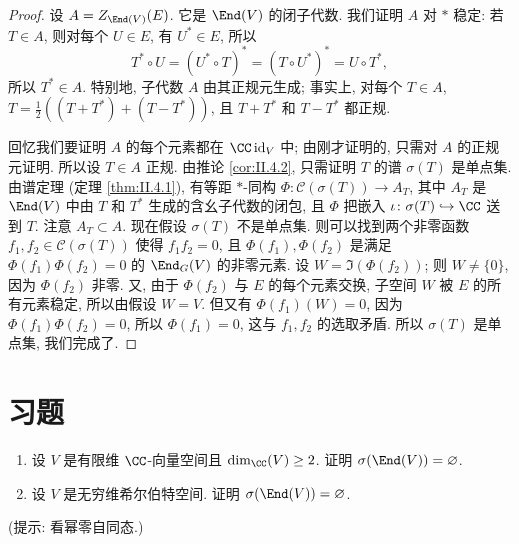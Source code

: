 \begin{proof}
设 $A = Z_{\End(V)}(E)$. 它是 $\End(V)$ 的闭子代数. 我们证明 $A$ 对 $*$ 稳定: 若 $T \in A$, 则对每个 $U \in E$, 有 $U^* \in E$, 所以
\[
T^* \circ U = (U^* \circ T)^* = (T \circ U^*)^* = U \circ T^*,
\]
所以 $T^* \in A$. 特别地, 子代数 $A$ 由其正规元生成; 事实上, 对每个 $T \in A$, $T = \frac{1}{2}((T + T^*) + (T - T^*))$, 且 $T + T^*$ 和 $T - T^*$ 都正规.

回忆我们要证明 $A$ 的每个元素都在 $\CC\,\mathrm{id}_V$ 中; 由刚才证明的, 只需对 $A$ 的正规元证明. 所以设 $T \in A$ 正规. 由推论 \ref{cor:II.4.2}, 只需证明 $T$ 的谱 $\sigma(T)$ 是单点集. 由谱定理 (定理 \ref{thm:II.4.1}), 有等距 $*$-同构 $\Phi \colon \mathcal{C}(\sigma(T)) \to A_T$, 其中 $A_T$ 是 $\End(V)$ 中由 $T$ 和 $T^*$ 生成的含幺子代数的闭包, 且 $\Phi$ 把嵌入 $\iota \colon \sigma(T) \hookrightarrow \CC$ 送到 $T$. 注意 $A_T \subset A$. 现在假设 $\sigma(T)$ 不是单点集. 则可以找到两个非零函数 $f_1, f_2 \in \mathcal{C}(\sigma(T))$ 使得 $f_1f_2 = 0$, 且 $\Phi(f_1), \Phi(f_2)$ 是满足 $\Phi(f_1)\Phi(f_2) = 0$ 的 $\End_G(V)$ 的非零元素. 设 $W = \Im(\Phi(f_2))$; 则 $W \neq \{0\}$, 因为 $\Phi(f_2)$ 非零. 又, 由于 $\Phi(f_2)$ 与 $E$ 的每个元素交换, 子空间 $W$ 被 $E$ 的所有元素稳定, 所以由假设 $W = V$. 但又有 $\Phi(f_1)(W) = 0$, 因为 $\Phi(f_1)\Phi(f_2) = 0$, 所以 $\Phi(f_1) = 0$, 这与 $f_1, f_2$ 的选取矛盾. 所以 $\sigma(T)$ 是单点集, 我们完成了.
\end{proof}

\section{习题}

\begin{exercise}
\label{ex:II.5.1}
\begin{enumerate}
\item[(a)] 设 $V$ 是有限维 $\CC$-向量空间且 $\dim_{\CC}(V) \geq 2$. 证明 $\sigma(\End(V)) = \emptyset$.
\item[(b)] 设 $V$ 是无穷维希尔伯特空间. 证明 $\sigma(\End(V)) = \emptyset$.
\end{enumerate}
(提示: 看幂零自同态.)
\end{exercise}

